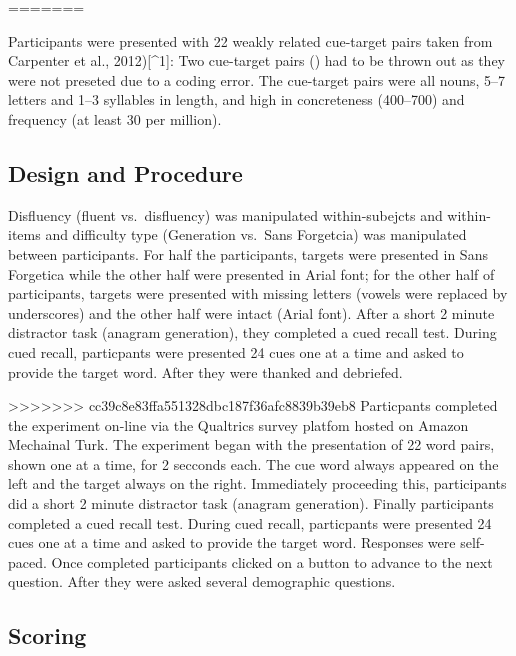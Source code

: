 \documentclass[pdf]{apa6}
\begin{document}
=======

Participants were presented with 22 weakly related cue-target pairs taken from Carpenter et al., 2012){[}\^{}1{]}: Two cue-target pairs () had to be thrown out as they were not preseted due to a coding error. The cue-target pairs were all nouns, 5--7 letters and 1--3 syllables in length, and high in concreteness (400--700) and frequency (at least 30 per million).

\hypertarget{design-and-procedure}{%
\subsection{Design and Procedure}\label{design-and-procedure}}

Disfluency (fluent vs.~disfluency) was manipulated within-subejcts and within-items and difficulty type (Generation vs.~Sans Forgetcia) was manipulated between participants. For half the participants, targets were presented in Sans Forgetica while the other half were presented in Arial font; for the other half of participants, targets were presented with missing letters (vowels were replaced by underscores) and the other half were intact (Arial font). After a short 2 minute distractor task (anagram generation), they completed a cued recall test. During cued recall, particpants were presented 24 cues one at a time and asked to provide the target word. After they were thanked and debriefed.

>>>>>>> cc39c8e83ffa551328dbc187f36afc8839b39eb8
Particpants completed the experiment on-line via the Qualtrics survey platfom hosted on Amazon Mechainal Turk. The experiment began with the presentation of 22 word pairs, shown one at a time, for 2 secconds each. The cue word always appeared on the left and the target always on the right. Immediately proceeding this, participants did a short 2 minute distractor task (anagram generation). Finally participants completed a cued recall test. During cued recall, particpants were presented 24 cues one at a time and asked to provide the target word. Responses were self-paced. Once completed participants clicked on a button to advance to the next question. After they were asked several demographic questions.

\hypertarget{scoring}{%
\subsection{Scoring}\label{scoring}}
\end{document}
